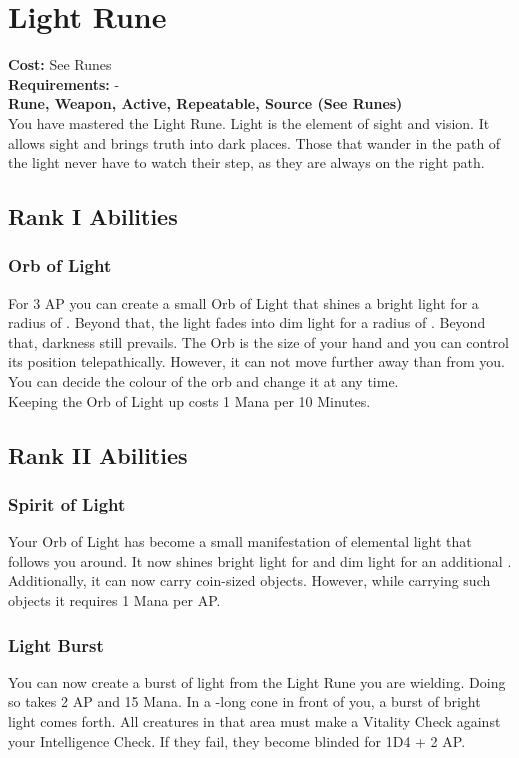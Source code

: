 \section{Light Rune}\label{rune:light}
\textbf{Cost:} See Runes\\
\textbf{Requirements:} -\\
\textbf{Rune, Weapon, Active, Repeatable, Source (See Runes)}\\
You have mastered the Light Rune.
Light is the element of sight and vision.
It allows sight and brings truth into dark places.
Those that wander in the path of the light never have to watch their step, as they are always on the right path.

\subsection{Rank I Abilities}

\subsubsection{Orb of Light}
For 3 AP you can create a small Orb of Light that shines a bright light for a radius of .
Beyond that, the light fades into dim light for a radius of .
Beyond that, darkness still prevails.
The Orb is the size of your hand and you can control its position telepathically.
However, it can not move further away than  from you.
You can decide the colour of the orb and change it at any time. \\
Keeping the Orb of Light up costs 1 Mana per 10 Minutes.


\subsection{Rank II Abilities}

\subsubsection{Spirit of Light}
Your Orb of Light has become a small manifestation of elemental light that follows you around.
It now shines bright light for  and dim light for an additional .\\
Additionally, it can now carry coin-sized objects.
However, while carrying such objects it requires 1 Mana per AP.

\subsubsection{Light Burst}
You can now create a burst of light from the Light Rune you are wielding.
Doing so takes 2 AP and 15 Mana.
In a -long cone in front of you, a burst of bright light comes forth.
All creatures in that area must make a Vitality Check against your Intelligence Check.
If they fail, they become blinded for 1D4 + 2 AP.

